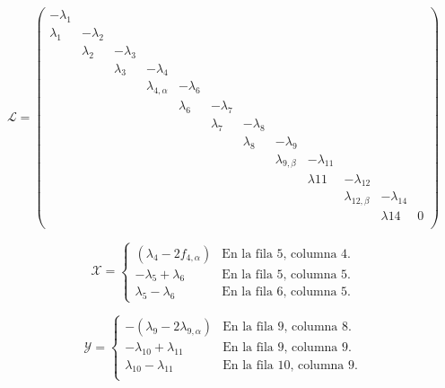 \begin{equation}
	\mathcal{L}=\left(\begin{smallmatrix}
		-\lambda_1& & & & & & & & & & & \\								%
		\lambda_1&-\lambda_2& & & & & & & & & & \\						%
		&\lambda_2&-\lambda_3& & & & & & & & & \\						%
		& & \lambda_3&-\lambda_4& & & & & & & & \\						%
		& & &\lambda_{4, \alpha}&-\lambda_6& & & & & & & \\					%
		& & & &\lambda_6 &-\lambda_7& & & & & & \\						%
		& & & & &\lambda_7&-\lambda_8& & & & & \\						%
		& & & & & &\lambda_8&-\lambda_9& & & & \\						%
		& & & & & & &\lambda_{9, \beta}&-\lambda_{11}& & & \\			%
		& & & & & & & &\lambda{11}&-\lambda_{12}& & \\					%
		& & & & & & & & &\lambda_{12, \beta}&-\lambda_{14}&\\			%
		& & & & & & & & & &\lambda{14}& 0\\						%
	\end{smallmatrix}\right)
\end{equation}\label{matriz_determinista_alternativa}

\begin{equation}
	\mathcal{X}=\begin{cases}
		(\lambda_4-2f_{4, \alpha}) & \textrm{En la fila 5, columna 4.}\\
		-\lambda_5+\lambda_6 & \textrm{En la fila 5, columna 5.}\\
		\lambda_5-\lambda_6 & \textrm{En la fila 6, columna 5.}
	\end{cases}
\end{equation}\label{matriz_estocastica_x}

\begin{equation}
	\mathcal{Y}=\begin{cases}
		-(\lambda_9-2\lambda_{9, \alpha}) & \textrm{En la fila 9, columna 8.}\\
		-\lambda_{10}+\lambda_{11} & \textrm{En la fila 9, columna 9.} \\
		\lambda_{10}-\lambda_{11} & \textrm{En la fila 10, columna 9.} \\
	\end{cases}
\end{equation}\label{matriz_estocastica_y}

